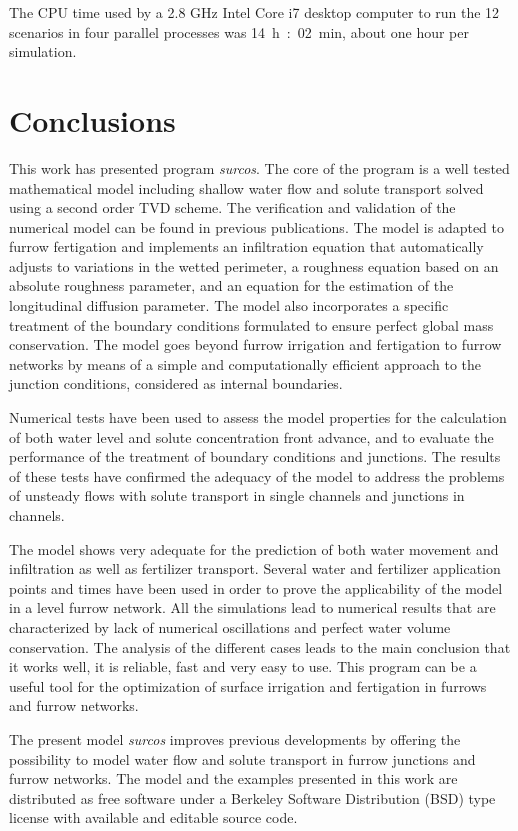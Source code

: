 \documentclass[review,authoryear]{elsarticle}
\begin{document}
The CPU time used by a 2.8 GHz Intel Core i7 desktop computer to run the 12
scenarios in four parallel processes was 14~h~:~02~min, about one hour per
simulation.

\section{Conclusions}

This work has presented program \emph{surcos}. The core of the program is a well tested mathematical model including shallow water flow and solute transport solved using a second order TVD scheme. The verification and validation of the
numerical model can be found in previous publications. The model is adapted to furrow fertigation and implements an infiltration equation that automatically adjusts to variations in the wetted
perimeter, a roughness equation based on an absolute roughness parameter, and an
equation for the estimation of the longitudinal diffusion parameter. The model also incorporates a specific treatment of the boundary conditions formulated to ensure perfect global mass conservation. The model goes beyond furrow irrigation and fertigation to furrow networks by means of a simple and computationally efficient approach to the
junction conditions, considered as internal boundaries.

Numerical tests have been used to assess the model properties for the calculation of both water level and solute concentration front advance, and to evaluate the performance of the treatment of boundary conditions and
junctions. The results of these tests have confirmed the adequacy of the model
to address the problems of unsteady flows with solute transport in single channels and junctions in channels. 

The model shows very adequate for the prediction of both water movement and infiltration as well as fertilizer transport. 
Several water and fertilizer application points and times have been used in order to prove the applicability of the model in a level furrow network. All the simulations lead to numerical results that are characterized by lack of numerical oscillations and perfect water volume conservation. The analysis of the different cases leads to 
the main conclusion that it works well, it is reliable, fast and very easy to use. This program 
can be a useful tool for the optimization of surface irrigation and fertigation in furrows and furrow
networks.

The present model \emph{surcos} improves previous
developments by offering the possibility to model water flow and solute
transport in furrow junctions and furrow networks. The model and the examples presented in this work are
distributed \citep{Surcos,SurcosGit} as free software under a Berkeley Software
Distribution (BSD) type license with available and editable source code.
\end{document}
